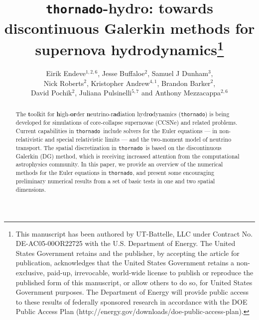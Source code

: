 \documentclass[letterpaper]{jpconf}
\newcommand{\thornado}{\texttt{thornado}}
\begin{document}
\title{\thornado-hydro: towards discontinuous Galerkin methods for supernova hydrodynamics\footnote{This manuscript has been authored by UT-Battelle, LLC under Contract No. DE-AC05-00OR22725 with the U.S. Department of Energy. The United States Government retains and the publisher, by accepting the article for publication, acknowledges that the United States Government retains a non-exclusive, paid-up, irrevocable, world-wide license to publish or reproduce the published form of this manuscript, or allow others to do so, for United States Government purposes. The Department of Energy will provide public access to these results of federally sponsored research in accordance with the DOE Public Access Plan (http://energy.gov/downloads/doe-public-access-plan).}}

\author{Eirik Endeve$^{1,2,6}$, Jesse Buffaloe$^{2}$, Samuel J Dunham$^{3}$, \\ Nick Roberts$^{2}$, Kristopher Andrew$^{4,1}$, Brandon Barker$^{2}$, \\ David Pochik$^{2}$, Juliana Pulsinelli$^{5,7}$ and Anthony Mezzacappa$^{2,6}$}
\address{$^{1}$Computer Science and Mathematics Division, Oak Ridge National Laboratory, TN 37831}
\address{$^{2}$Department of Physics and Astronomy, University of Tennessee Knoxville, TN 37996}
\address{$^{3}$Department of Astronomy, Vanderbilt University, TN 37212}
\address{$^{4}$Department of Physics and Astronomy, University of Kentucky, Lexington, KY 40506}
\address{$^{5}$Princeton University, NJ 08544}
\address{$^{6}$Joint Institute for Computational Sciences, Oak Ridge National Laboratory, TN 37831}
\address{$^{7}$Physics Division, Oak Ridge National Laboratory, TN 37831}

\begin{abstract}
The {\bf t}oolkit for {\bf h}igh-{\bf or}der {\bf n}eutrino-r{\bf ad}iation hydr{\bf o}dynamics (\thornado) is being developed for simulations of core-collapse supernovae (CCSNe) and related problems.  
Current capabilities in \thornado\ include solvers for the Euler equations --- in non-relativistic and special relativistic limits --- and the two-moment model of neutrino transport.  
The spatial discretization in \thornado\ is based on the discontinuous Galerkin (DG) method, which is receiving increased attention from the computational astrophysics community.  
In this paper, we provide an overview of the numerical methods for the Euler equations in \thornado, and present some encouraging preliminary numerical results from a set of basic tests in one and two spatial dimensions.  
\end{abstract}
\end{document}
